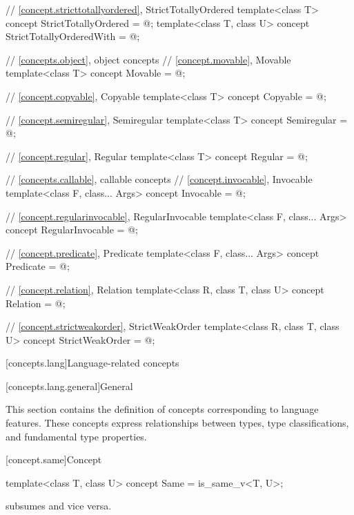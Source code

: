 \begin{codeblock}
{  // \ref{concept.stricttotallyordered}, StrictTotallyOrdered
  template<class T>
    concept StrictTotallyOrdered = @\seebelow@;
  template<class T, class U>
    concept StrictTotallyOrderedWith = @\seebelow@;

  // \ref{concepts.object}, object concepts
  // \ref{concept.movable}, Movable
  template<class T>
    concept Movable = @\seebelow@;

  // \ref{concept.copyable}, Copyable
  template<class T>
    concept Copyable = @\seebelow@;

  // \ref{concept.semiregular}, Semiregular
  template<class T>
    concept Semiregular = @\seebelow@;

  // \ref{concept.regular}, Regular
  template<class T>
    concept Regular = @\seebelow@;

  // \ref{concepts.callable}, callable concepts
  // \ref{concept.invocable}, Invocable
  template<class F, class... Args>
    concept Invocable = @\seebelow@;

  // \ref{concept.regularinvocable}, RegularInvocable
  template<class F, class... Args>
    concept RegularInvocable = @\seebelow@;

  // \ref{concept.predicate}, Predicate
  template<class F, class... Args>
    concept Predicate = @\seebelow@;

  // \ref{concept.relation}, Relation
  template<class R, class T, class U>
    concept Relation = @\seebelow@;

  // \ref{concept.strictweakorder}, StrictWeakOrder
  template<class R, class T, class U>
    concept StrictWeakOrder = @\seebelow@;
}
\end{codeblock}

[concepts.lang]{Language-related concepts}

[concepts.lang.general]{General}

\pnum
This section contains the definition of concepts corresponding to language
features. These concepts express relationships between types, type
classifications, and fundamental type properties.

[concept.same]{Concept }

%
\begin{itemdecl}
template<class T, class U>
  concept Same = is_same_v<T, U>;
\end{itemdecl}

\begin{itemdescr}
\pnum
{} subsumes  and
vice versa.
\end{itemdescr}


